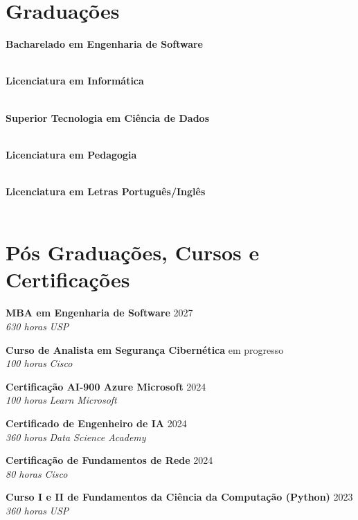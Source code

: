 \documentclass[a4paper,10pt]{article}
\newcommand{\entry}[4]{
  \noindent\textbf{#1} \hfill #2 \\
  \noindent\textit{#3} \hfill \textit{#4} \\
  \vspace{2pt}
}
\begin{document}
\vspace{0.6em}

\vspace{0.5em}

\section*{Graduações}
\vspace{0.6em}

\entry{Bacharelado em Engenharia de Software}{\faCalendar \space 2027}{}
\space
\vspace{-1.6em}

\entry{Licenciatura em Informática}{\faCalendar {}}{}
\space
\vspace{-1.6em}

\entry{Superior Tecnologia em Ciência de Dados}{\faCalendar \space 
 2022}{}
\space
\vspace{-1.6em}

\entry{Licenciatura em Pedagogia}{\faCalendar {}}{}
\space
\vspace{-1.6em}

\entry{Licenciatura em Letras Português/Inglês}{\faCalendar \space 
 2014}{}
\space
\vspace{-1.6em}





\section*{Pós Graduações, Cursos e Certificações}
\vspace{0.6em}

\entry{MBA em Engenharia de Software}{2027}{630 horas}{\faMapMarker \space USP}

\entry{Curso de Analista em Segurança Cibernética}{em progresso}{100 horas}{\faMapMarker \space Cisco}

\entry{Certificação AI-900 Azure Microsoft}{2024}{100 horas}{\faMapMarker \space Learn Microsoft}

\entry{Certificado de Engenheiro  de IA}{2024}{360 horas}{\faMapMarker \space Data Science Academy}

\entry{Certificação de Fundamentos de Rede}{2024}{80 horas}{\faMapMarker \space Cisco}

\entry{Curso I e II de Fundamentos da Ciência da Computação (Python)}{2023}{360 horas}{\faMapMarker \space USP}
\end{document}
